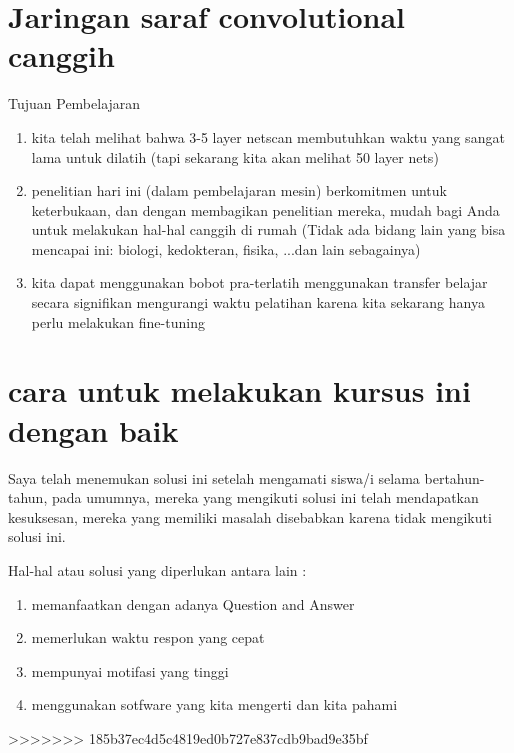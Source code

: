 \section{Jaringan saraf convolutional canggih}
Tujuan Pembelajaran
\begin{enumerate}

\item  kita telah melihat bahwa 3-5 layer netscan membutuhkan waktu yang sangat lama untuk dilatih
(tapi sekarang kita akan melihat 50 layer nets)
\item penelitian hari ini (dalam pembelajaran mesin) berkomitmen untuk keterbukaan, dan dengan membagikan penelitian mereka, mudah bagi Anda untuk melakukan hal-hal canggih di rumah
(Tidak ada bidang lain yang bisa mencapai ini: biologi, kedokteran, fisika, ...dan lain sebagainya)
\item kita dapat menggunakan bobot pra-terlatih menggunakan transfer belajar secara signifikan mengurangi waktu pelatihan karena kita sekarang hanya perlu melakukan fine-tuning
\end{enumerate}

\section{cara untuk melakukan kursus ini dengan baik}
Saya telah menemukan solusi ini setelah mengamati siswa/i selama bertahun-tahun,
pada umumnya, mereka yang mengikuti solusi ini telah mendapatkan kesuksesan, mereka yang memiliki masalah disebabkan karena tidak mengikuti solusi ini.

Hal-hal atau solusi yang diperlukan antara lain :
\begin{enumerate}
\item memanfaatkan dengan adanya Question and Answer  
\item memerlukan waktu respon yang cepat
\item mempunyai motifasi yang tinggi
\item menggunakan sotfware yang kita mengerti dan kita pahami 
\end {enumerate}

>>>>>>> 185b37ec4d5c4819ed0b727e837cdb9bad9e35bf
